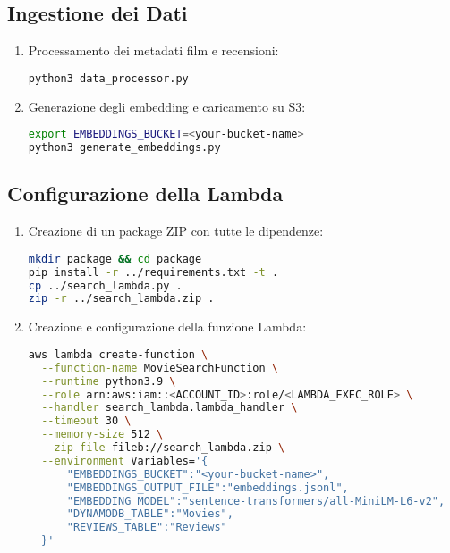 \documentclass[11pt,a4paper]{article}
\begin{document}
\subsection{Ingestione dei Dati}
\begin{enumerate}
  \item Processamento dei metadati film e recensioni:
\begin{lstlisting}[language=bash]
python3 data_processor.py
\end{lstlisting}

  \item Generazione degli embedding e caricamento su S3:
\begin{lstlisting}[language=bash]
export EMBEDDINGS_BUCKET=<your-bucket-name>
python3 generate_embeddings.py
\end{lstlisting}
\end{enumerate}

\subsection{Configurazione della Lambda}
\begin{enumerate}
  \item Creazione di un package ZIP con tutte le dipendenze:
\begin{lstlisting}[language=bash]
mkdir package && cd package
pip install -r ../requirements.txt -t .
cp ../search_lambda.py .
zip -r ../search_lambda.zip .
\end{lstlisting}

  \item Creazione e configurazione della funzione Lambda:
\begin{lstlisting}[language=bash]
aws lambda create-function \
  --function-name MovieSearchFunction \
  --runtime python3.9 \
  --role arn:aws:iam::<ACCOUNT_ID>:role/<LAMBDA_EXEC_ROLE> \
  --handler search_lambda.lambda_handler \
  --timeout 30 \
  --memory-size 512 \
  --zip-file fileb://search_lambda.zip \
  --environment Variables='{
      "EMBEDDINGS_BUCKET":"<your-bucket-name>",
      "EMBEDDINGS_OUTPUT_FILE":"embeddings.jsonl",
      "EMBEDDING_MODEL":"sentence-transformers/all-MiniLM-L6-v2", 
      "DYNAMODB_TABLE":"Movies",
      "REVIEWS_TABLE":"Reviews"
  }'
\end{lstlisting}
\end{enumerate}
\end{document}
